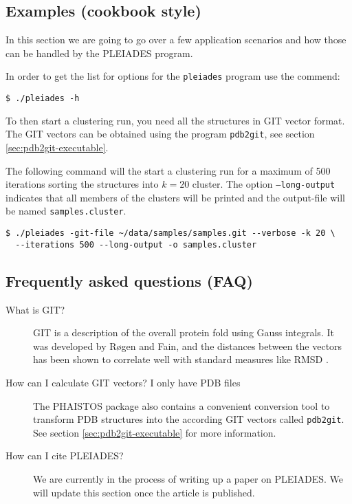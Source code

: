 \subsection{Examples (cookbook style)}
\label{sec:examples}

In this section we are going to go over a few application scenarios and how those can be 
handled by the PLEIADES program.

In order to get the list for options for the \texttt{pleiades} program use the commend:

\begin{verbatim}
$ ./pleiades -h
\end{verbatim}

\noindent To then start a clustering run, you need all the structures
in GIT vector format. The GIT vectors can be obtained using the
program \texttt{pdb2git}, see section \ref{sec:pdb2git-executable}.

The following command will the start a clustering run for a maximum of
500 iterations sorting the structures into $k=20$ cluster. The option
\texttt{--long-output} indicates that all members of the clusters will
be printed and the output-file will be named \texttt{samples.cluster}.

\begin{verbatim}
$ ./pleiades -git-file ~/data/samples/samples.git --verbose -k 20 \
  --iterations 500 --long-output -o samples.cluster
\end{verbatim}


\subsection{Frequently asked questions (FAQ)}
\label{sec:faq}

\begin{description}
\item[What is GIT?] GIT is a description of the overall protein fold
  using Gauss integrals. It was developed by R{\o}gen and Fain, and
  the distances between the vectors has been shown to correlate well
  with standard measures like RMSD \cite{roegen2003automatic}.


\item[How can I calculate GIT vectors? I only have PDB files] The
  PHAISTOS package also contains a convenient conversion tool to
  transform PDB structures into the according GIT vectors called
  {\tt{pdb2git}}. See section \ref{sec:pdb2git-executable} for more
  information.

\item[How can I cite PLEIADES?] We are currently in the process of
  writing up a paper on PLEIADES.  We will update this section once
  the article is published.

\end{description}

